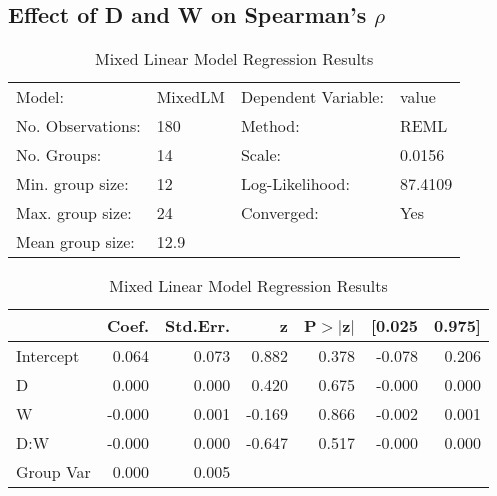 \documentclass{article}
\begin{document}
\subsection{Effect of D and W on Spearman's $\rho$}
\begin{table}
    \caption{Mixed Linear Model Regression Results}
    \label{}
    \begin{center}
    \begin{tabular}{llll}
    \hline
    Model:            & MixedLM & Dependent Variable: & value    \\
    No. Observations: & 180     & Method:             & REML     \\
    No. Groups:       & 14      & Scale:              & 0.0156   \\
    Min. group size:  & 12      & Log-Likelihood:     & 87.4109  \\
    Max. group size:  & 24      & Converged:          & Yes      \\
    Mean group size:  & 12.9    &                     &          \\
    \hline
    \end{tabular}
    \end{center}
    
    \begin{center}
    \begin{tabular}{lrrrrrr}
    \hline
              &  Coef. & Std.Err. &      z & P$> |$z$|$ & [0.025 & 0.975]  \\
    \hline
    Intercept &  0.064 &    0.073 &  0.882 &       0.378 & -0.078 &  0.206  \\
    D         &  0.000 &    0.000 &  0.420 &       0.675 & -0.000 &  0.000  \\
    W         & -0.000 &    0.001 & -0.169 &       0.866 & -0.002 &  0.001  \\
    D:W       & -0.000 &    0.000 & -0.647 &       0.517 & -0.000 &  0.000  \\
    Group Var &  0.000 &    0.005 &        &             &        &         \\
    \hline
    \end{tabular}
    \end{center}
    \end{table}
    
\end{document}
